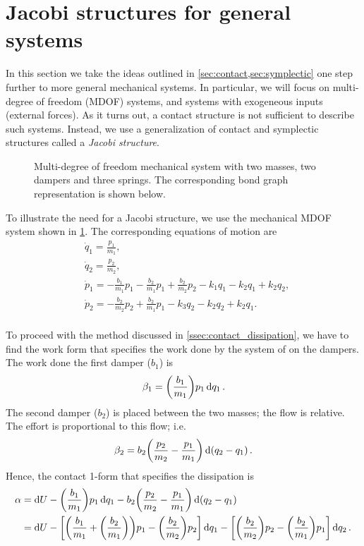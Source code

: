 \section{Jacobi structures for general systems}
\label{sec:jacobi}
In this section we take the ideas outlined in \cref{sec:contact,sec:symplectic} one step further to more general mechanical systems. In particular, we will focus on multi-degree of freedom (MDOF) systems, and systems with exogeneous inputs (external forces). As it turns out, a contact structure is not sufficient to describe such systems. Instead, we use a generalization of contact and symplectic structures called a \emph{Jacobi structure}.

\begin{figure}[ht!]
    \centering
    
    \caption{Multi-degree of freedom mechanical system with two masses, two dampers and three springs. The corresponding bond graph representation is shown below.}
    \label{fig:mdof_oscillator}
\end{figure}

To illustrate the need for a Jacobi structure, we use the mechanical MDOF system shown in \cref{fig:mdof_oscillator}. The corresponding equations of motion are
\begin{equation}
    \begin{split}
        &\dot{q}_1 = \frac{p_1}{m_1}, \\
        &\dot{q}_2 = \frac{p_2}{m_2}, \\
        &\dot{p}_1 = -\frac{b_1}{m_1}p_1 - \frac{b_2}{m_1}p_1 + \frac{b_2}{m_2}p_2 - k_1 q_1 - k_2 q_1 + k_2 q_2, \\
        &\dot{p}_2 =  - \frac{b_2}{m_2}p_2 + \frac{b_2}{m_1}p_1 - k_3 q_2 - k_2 q_2 + k_2 q_1. \\
    \end{split}
\end{equation}

To proceed with the method discussed in \cref{ssec:contact_dissipation}, we have to find the work form that specifies the work done by the system of on the dampers. The work done the first damper ($b_1$) is
$$ \beta_1 = \qty(\frac{b_1}{m_1})p_1\dd{q_1}. $$
The second damper ($b_2$) is placed between the two masses; the flow is relative. The effort is proportional to this flow; i.e.
$$ \beta_2 = b_2\qty(\frac{p_2}{m_2} - \frac{p_1}{m_1})\dd{\qty(q_2 - q_1)}. $$
Hence, the contact 1-form that specifies the dissipation is
\begin{equation}
    \begin{split}
        \alpha  &= \dd{U} - \qty(\frac{b_1}{m_1})p_1\dd{q_1} - b_2\qty(\frac{p_2}{m_2} - \frac{p_1}{m_1})\dd{\qty(q_2 - q_1)} \\
                &= \dd{U} - \qty[\qty(\frac{b_1}{m_1} + \qty(\frac{b_2}{m_1})) p_1 - \qty(\frac{b_2}{m_2})p_2]\dd{q_1}
                          - \qty[\qty(\frac{b_2}{m_2})p_2 - \qty(\frac{b_2}{m_1})p_1]\dd{q_2}.
    \end{split}
    \label{eq:mdof_form}
\end{equation}


